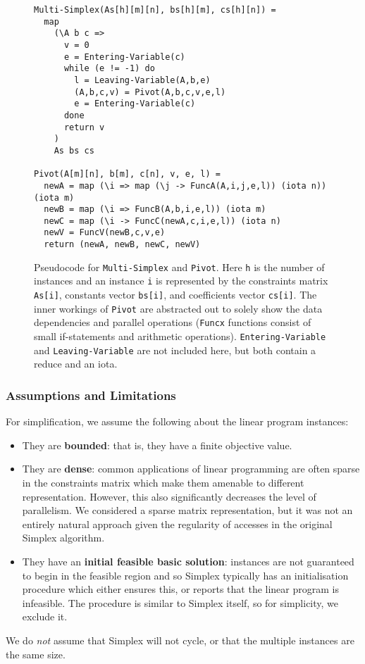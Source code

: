 \begin{figure}[H]
\begin{verbatim}
Multi-Simplex(As[h][m][n], bs[h][m], cs[h][n]) =
  map
    (\A b c =>
      v = 0
      e = Entering-Variable(c)
      while (e != -1) do
        l = Leaving-Variable(A,b,e)
        (A,b,c,v) = Pivot(A,b,c,v,e,l)
        e = Entering-Variable(c)
      done
      return v
    )
    As bs cs

Pivot(A[m][n], b[m], c[n], v, e, l) =
  newA = map (\i => map (\j -> FuncA(A,i,j,e,l)) (iota n)) (iota m)
  newB = map (\i => FuncB(A,b,i,e,l)) (iota m)
  newC = map (\i -> FuncC(newA,c,i,e,l)) (iota n)
  newV = FuncV(newB,c,v,e)
  return (newA, newB, newC, newV)
\end{verbatim}
\caption{Pseudocode for \texttt{Multi-Simplex} and \texttt{Pivot}. Here \texttt{h} is the number of instances and an instance \texttt{i} is represented by the constraints matrix \texttt{As[i]}, constants vector \texttt{bs[i]}, and coefficients vector \texttt{cs[i]}.\newline
The inner workings of \texttt{Pivot} are abstracted out to solely show the data dependencies and parallel operations (\texttt{Funcx} functions consist of small if-statements and arithmetic operations). \texttt{Entering-Variable} and \texttt{Leaving-Variable} are not included here, but both contain a reduce and an iota.}
\label{code:multi-simplex}
\end{figure}

\subsubsection{Assumptions and Limitations}
For simplification, we assume the following about the linear program instances:
\begin{itemize}
\item They are \textbf{bounded}: that is, they have a finite objective value.
\item They are \textbf{dense}: common applications of linear programming are often sparse in the constraints matrix which make them amenable to different representation. However, this also significantly decreases the level of parallelism. We considered a sparse matrix representation, but it was not an entirely natural approach given the regularity of accesses in the original Simplex algorithm.
\item They have an \textbf{initial feasible basic solution}: instances are not guaranteed to begin in the feasible region and so Simplex typically has an initialisation procedure which either ensures this, or reports that the linear program is infeasible. The procedure is similar to Simplex itself, so for simplicity, we exclude it.
\end{itemize}
We do \textit{not} assume that Simplex will not cycle, or that the multiple instances are the same size.

